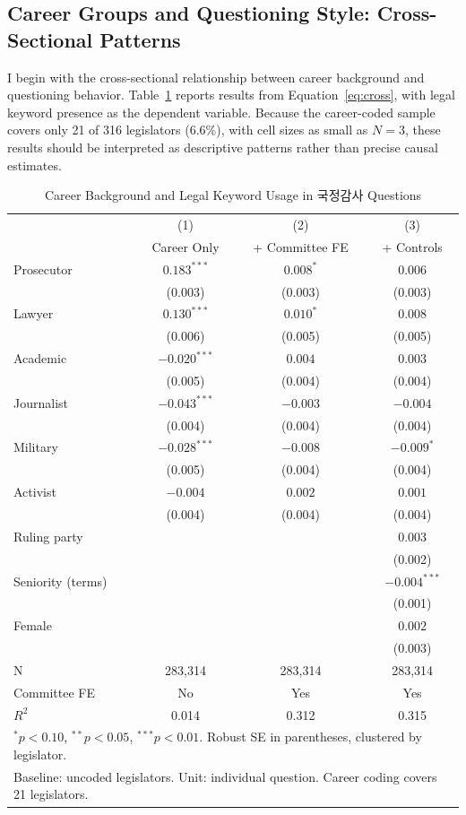 \documentclass[11pt]{article}
\begin{document}
\subsection{Career Groups and Questioning Style: Cross-Sectional Patterns}

I begin with the cross-sectional relationship between career background and questioning behavior. Table~\ref{tab:career} reports results from Equation~\ref{eq:cross}, with legal keyword presence as the dependent variable. Because the career-coded sample covers only 21 of 316 legislators (6.6\%), with cell sizes as small as $N = 3$, these results should be interpreted as descriptive patterns rather than precise causal estimates.

\begin{table}[htbp]
\centering
\caption{Career Background and Legal Keyword Usage in 국정감사 Questions}
\label{tab:career}
\begin{tabular}{lccc}
\toprule
 & (1) & (2) & (3) \\
 & Career Only & + Committee FE & + Controls \\
\midrule
Prosecutor & $0.183^{***}$ & $0.008^{*}$ & $0.006$ \\
 & (0.003) & (0.003) & (0.003) \\[4pt]
Lawyer & $0.130^{***}$ & $0.010^{*}$ & $0.008$ \\
 & (0.006) & (0.005) & (0.005) \\[4pt]
Academic & $-0.020^{***}$ & $0.004$ & $0.003$ \\
 & (0.005) & (0.004) & (0.004) \\[4pt]
Journalist & $-0.043^{***}$ & $-0.003$ & $-0.004$ \\
 & (0.004) & (0.004) & (0.004) \\[4pt]
Military & $-0.028^{***}$ & $-0.008$ & $-0.009^{*}$ \\
 & (0.005) & (0.004) & (0.004) \\[4pt]
Activist & $-0.004$ & $0.002$ & $0.001$ \\
 & (0.004) & (0.004) & (0.004) \\[4pt]
Ruling party & & & $0.003$ \\
 & & & (0.002) \\[4pt]
Seniority (terms) & & & $-0.004^{***}$ \\
 & & & (0.001) \\[4pt]
Female & & & $0.002$ \\
 & & & (0.003) \\
\midrule
N & 283,314 & 283,314 & 283,314 \\
Committee FE & No & Yes & Yes \\
$R^2$ & 0.014 & 0.312 & 0.315 \\
\bottomrule
\multicolumn{4}{l}{\footnotesize $^*p<0.10$, $^{**}p<0.05$, $^{***}p<0.01$. Robust SE in parentheses, clustered by legislator.} \\
\multicolumn{4}{l}{\footnotesize Baseline: uncoded legislators. Unit: individual question. Career coding covers 21 legislators.} \\
\end{tabular}
\end{table}
\end{document}
